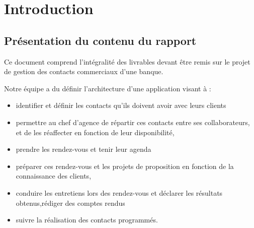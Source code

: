 





\listoftodos
\newpage
{}
\tableofcontents
{}
{%
\let\oldnumberline\numberline%
\renewcommand{\numberline}{\figurename~\oldnumberline}%
\renewcommand\listfigurename{Liste des figures}
\listoffigures%
}
{%
\let\oldnumberline\numberline%
\renewcommand{\numberline}{\tablename~\oldnumberline}%
\renewcommand\listtablename{Liste des tableaux}
\listoftables%
}

\newpage
{}
\chapter*{Introduction}
\section*{Présentation du contenu du rapport}
Ce document comprend l'intégralité des livrables devant être remis sur le projet de gestion des contacts commerciaux d'une banque. 

Notre équipe a du définir l'architecture d'une application visant à : \\
\begin{itemize}
\item identifier et définir les contacts qu’ils doivent avoir avec leurs clients
\item permettre au chef d’agence de répartir ces contacts entre ses collaborateurs, et de les réaffecter en fonction de leur disponibilité,
\item prendre les rendez-vous et tenir leur agenda
\item préparer ces rendez-vous et les projets de proposition en fonction de la connaissance des
clients,
\item conduire les entretiens lors des rendez-vous et déclarer les résultats obtenus,rédiger des comptes rendus
\item suivre la réalisation des contacts programmés.\\

\end{itemize}


